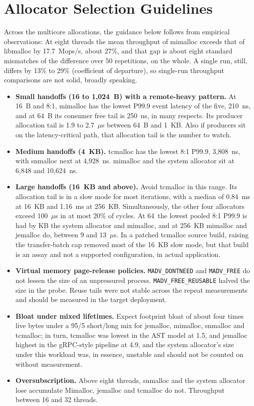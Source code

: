 \section{Allocator Selection Guidelines}
\label{sec:guidelines}
Across the multicore allocations, the guidance below follows from empirical observations:
At eight threads the mean throughput of mimalloc exceeds that of libmalloc by
17.7~Mops/s, about 27\%, and that gap is about eight standard mismatches of the difference over 50 repetitions, on the whole. A single
run, still, differs by 13\% to 29\% (coefficient of departure), so single-run throughput comparisons are not solid, broadly speaking.

\begin{itemize}
\item \textbf{Small handoffs (16 to 1{,}024~B) with a remote-heavy pattern.} At 16~B and 8:1, mimalloc has
the lowest P99.9 event latency of the five, 210~ns, and at 64~B its consumer free tail is 250~ns, in many respects. Its
producer allocation tail is 1.9 to 2.7~$\mu$s between 64~B and 1~KB. Also if producers sit on the
latency-critical path, that allocation tail is the number to watch.
\item \textbf{Medium handoffs (4~KB).} tcmalloc has the lowest 8:1 P99.9, 3{,}808~ns, with snmalloc next at
4{,}928~ns. mimalloc and the system allocator sit at 6{,}848 and 10{,}624~ns.
\item \textbf{Large handoffs (16~KB and above).} Avoid tcmalloc in this range. Its allocation tail is in a slow mode for most iterations, with a median of
0.84~ms at 16~KB and 1.16~ms at 256~KB. Simultaneously, the other four allocators exceed 100~$\mu$s in at most 20\% of
cycles. At 64~the lowest pooled 8:1 P99.9 is had by KB the system allocator and mimalloc, and at 256~KB mimalloc and jemalloc do,
between 9 and 13~$\mu$s. In a patched tcmalloc source build, raising the transfer-batch cap removed
most of the 16~KB slow mode, but that build is an assay and not a supported configuration, in actual application.
\item \textbf{Virtual memory page-release policies.} \texttt{MADV\_DONTNEED} and \texttt{MADV\_FREE} do not lessen the size of
an unpressured process. \texttt{MADV\_FREE\_REUSABLE} halved the size in the probe. Reuse tails were not
stable across the repeat measurements and should be measured in the target deployment.
\item \textbf{Bloat under mixed lifetimes.} Expect footprint bloat of about four times live bytes under a
95/5 short/long mix for jemalloc, mimalloc, snmalloc and tcmalloc; in turn, tcmalloc was lowest in the AST model at
1.5, and jemalloc highest in the gRPC-style pipeline at 4.9, and the system allocator's size under this
workload was, in essence, unstable and should not be counted on without measurement.
\item \textbf{Oversubscription.} Above eight threads, snmalloc and the system allocator lose accumulate
Mimalloc, jemalloc and tcmalloc do not. Throughput between 16 and 32 threads.
\end{itemize}
